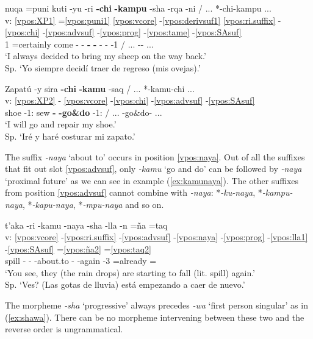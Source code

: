 \documentclass[output=paper]{langscibook}
\begin{document}
\ea \label{ex:chikampu}{
    \glll {} nuqa =puni kuti -yu -ri \textbf{-chi} \textbf{-kampu} -sha -rqa -ni / ... *-chi-kampu ... \\
    v: \ref{vpos:XP1} =\ref{vpos:puni1} \ref{vpos:vcore} -\ref{vpos:derivsuf1} \ref{vpos:ri.suffix} -\ref{vpos:chi} -\ref{vpos:advsuf} -\ref{vpos:prog} -\ref{vpos:tame} -\ref{vpos:SAsuf} \\
    {} 1\Sg{} =certainly come -\Cmpl{} -\Aff{} \textbf{-\Caus{}} \textbf{-\Dir{}} -\Prog{} -\Pst{} -1\Sg{} / ... -\Caus{}-\Mot{} ... \\
    \glt `I always decided to bring my sheep on the way back.' \\ Sp. `Yo siempre decidí traer de regreso (mis ovejas).' }
\z

\ea \label{ex:chikamu}{
    \glll {} Zapatú -y sira \textbf{-chi} \textbf{-kamu} -saq / ... *-kamu-chi ... \\
    v: \ref{vpos:XP2} - \ref{vpos:vcore} -\ref{vpos:chi} -\ref{vpos:advsuf} -\ref{vpos:SAsuf}  \\
    {} shoe -1\Sg{}:\Poss{} sew \textbf{-\Caus{}} \textbf{-go\&do} -1\Sg{}:\Fut{} / ... -go\&do-\Caus{} ...  \\
    \glt `I will go and repair my shoe.' \\ Sp. `Iré y haré costurar mi zapato.' }
\z 

The suffix \textit{-naya} `about to' occurs in position \ref{vpos:naya}. Out of all the suffixes that fit out slot \ref{vpos:advsuf}, only \textit{-kamu} `go and do' can be followed by \textit{-naya} `proximal future' as we can see in example (\ref{ex:kamunaya}). The other suffixes from position \ref{vpos:advsuf} cannot combine with \textit{-naya}: *\textit{-ku-naya}, *\textit{-kampu-naya}, *\textit{-kapu-naya}, *\textit{-mpu-naya} and so on. 

\ea \label{ex:kamunaya}{
   \glll {} t'aka -ri -kamu -naya -sha -lla -n =ña =taq \\
   v: \ref{vpos:vcore} -\ref{vpos:ri.suffix} -\ref{vpos:advsuf} -\ref{vpos:naya} -\ref{vpos:prog} -\ref{vpos:lla1} -\ref{vpos:SAsuf} =\ref{vpos:ña2} =\ref{vpos:taq2} \\
   {} spill -\Incept{} -\Dir{} -about.to -\Prog{} -again -3\Sg{} =already =\Conj{} \\
   \glt `You see, they (the rain drops) are starting to fall (lit. spill) again.' \\  Sp. `Ves? (Las gotas de lluvia) está empezando a caer de nuevo.'}
\z 

The morpheme \textit{-sha} `progressive' always precedes \textit{-wa} `first person singular' as in (\ref{ex:shawa}). There can be no morpheme intervening between these two and the reverse order is ungrammatical.
\end{document}
